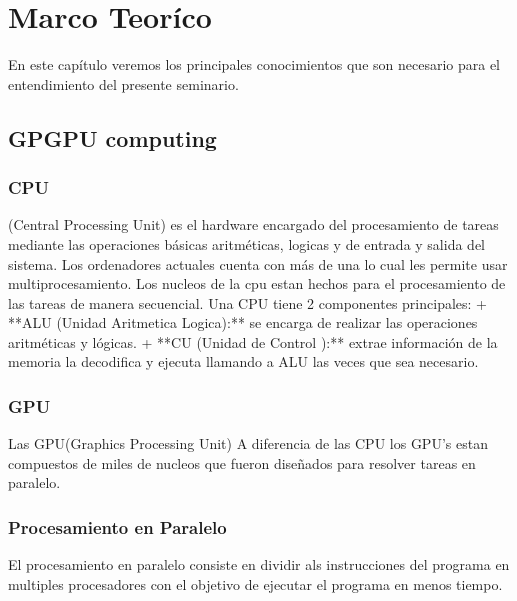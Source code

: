 \chapter{Marco Teoríco}

En este capítulo veremos los principales conocimientos que son necesario para el entendimiento del presente seminario.
\section{GPGPU computing}
\subsection{CPU}(Central Processing Unit) es el hardware encargado del procesamiento de tareas mediante las operaciones básicas aritméticas, logicas y de entrada y salida del sistema. Los ordenadores actuales cuenta con más de una lo cual les permite usar multiprocesamiento. Los nucleos de la cpu estan hechos para el procesamiento de las tareas de manera secuencial.
Una CPU tiene 2 componentes principales:
+ **ALU (Unidad Aritmetica Logica):** se encarga de realizar las operaciones aritméticas y lógicas.
+ **CU  (Unidad de Control       ):** extrae información de la memoria la decodifica y ejecuta llamando a ALU las veces que sea necesario.

\subsection{GPU}
Las GPU(Graphics Processing Unit)
A diferencia de las CPU los GPU's estan compuestos de miles de nucleos que fueron diseñados para resolver tareas en paralelo.

\subsection{Procesamiento en Paralelo}
El procesamiento en paralelo consiste en dividir als instrucciones del programa en multiples procesadores con el objetivo de ejecutar el programa en menos tiempo.

